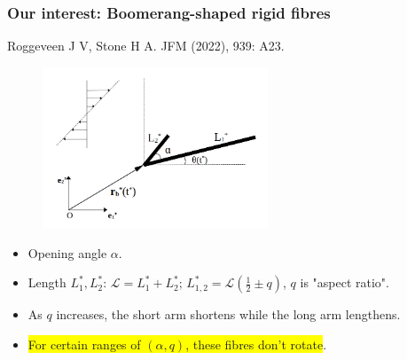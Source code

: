 \documentclass{beamer}
\newcommand{\bi}{\begin{itemize}}
\newcommand{\ei}{\end{itemize}}
\begin{document}
\begin{frame}
	\frametitle{Our interest: Boomerang-shaped rigid fibres}
	\begin{overlayarea}{\textwidth}{\textheight}
		\vspace{-0.5cm}\footnotesize Roggeveen J V, Stone H A. JFM (2022), 939: A23.\vspace{-0.2cm}
		\begin{figure}[htb]
			\begin{center}
				\includegraphics[width=0.6\textwidth]{plots/schematic/schematic_rigid_configuration.png}
			\end{center}
		\end{figure}\vspace{-0.3cm}
		\small \bi
		\item Opening angle $\alpha$. 
		\item Length $L_1^*,L_2^*$: $\mathcal{L}=L_1^*+L_2^*;\, L_{1,2}^*=\mathcal{L}(\frac{1}{2}\pm q)$, $q$ is "aspect ratio".
		\item As $q$ increases, the short arm shortens while the long arm lengthens.
		\item \colorbox{yellow}{For certain ranges of $(\alpha,q)$, these fibres don't rotate}.
		\ei 
	\end{overlayarea}
\end{frame}


\end{document}
